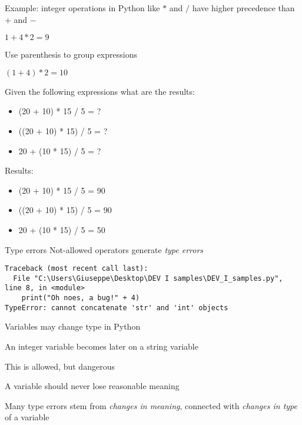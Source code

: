 \documentclass{beamer}
\begin{document}
\begin{slide}{
\item Example: integer operations in Python like $*$ and $/$ have higher precedence than $+$ and $-$
\item $1 + 4 * 2 = 9$
\pause
\item Use parenthesis to group expressions 
\item $(1 + 4) * 2 = 10$  
}\end{slide}

\begin{slide}{
\item Given the following expressions what are the results:
\begin{itemize}
\item (20 + 10) * 15 / 5 = ?
\item ((20 + 10) * 15) / 5 = ?
\item 20 + (10 * 15) / 5 = ?
\end{itemize}
\pause 
\item Results: 
\begin{itemize}
\item (20 + 10) * 15 / 5 = 90
\item ((20 + 10) * 15) / 5 = 90
\item 20 + (10 * 15) / 5 = 50
\end{itemize}
}\end{slide}


\begin{frame}[fragile]{Type errors}
Not-allowed operators generate \textit{type errors}

\begin{lstlisting}[frame=shadowbox]
Traceback (most recent call last):
  File "C:\Users\Giuseppe\Desktop\DEV I samples\DEV_I_samples.py", line 8, in <module>
    print("Oh noes, a bug!" + 4)
TypeError: cannot concatenate 'str' and 'int' objects
\end{lstlisting}
\end{frame}

\begin{slide}{
\item Variables may change type in Python
\item An integer variable becomes later on a string variable
\item This is allowed, but dangerous
\item A variable should never lose reasonable meaning
\item Many type errors stem from \textit{changes in meaning}, connected with \textit{changes in type} of a variable
}\end{slide}
\end{document}
